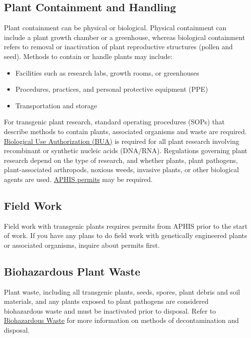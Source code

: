 \subsection{Plant Containment and Handling} 
Plant containment can be physical or biological. Physical containment can include a plant growth chamber or a greenhouse, whereas biological containment refers to removal or inactivation of plant reproductive structures (pollen and seed). Methods to contain or handle plants may include:
\begin{itemize}
    \item Facilities such as research labs, growth rooms, or greenhouses
    \item Procedures, practices, and personal protective equipment (PPE)
    \item Transportation and storage
\end{itemize}
For transgenic plant research, standard operating procedures (SOPs) that describe methods to contain plants, associated organisms and waste are required.
\href{https://www.ehs.washington.edu/biological/biological-research-approval}{Biological Use Authorization (BUA)} is required for all plant research involving recombinant or synthetic nucleic acids (DNA/RNA).
Regulations governing plant research depend on the type of research, and whether plants, plant pathogens, plant-associated arthropods, noxious weeds, invasive plants, or other biological agents are used.
\href{http://www.aphis.usda.gov/aphis/resources/permits}{APHIS permits} may be required.

\subsection{Field Work} 
Field work with transgenic plants requires permits from APHIS prior to the start of work. If you have any plans to do field work with genetically engineered plants or associated organisms, inquire about permits first.
\subsection{Biohazardous Plant Waste}
Plant waste, including all transgenic plants, seeds, spores, plant debris and soil materials, and any plants exposed to plant pathogens are considered biohazardous waste and must be inactivated prior to disposal. Refer to \href{https://www.ehs.washington.edu/biological/biohazardous-waste}{Biohazardous Waste} for more information on methods of decontamination and disposal.


